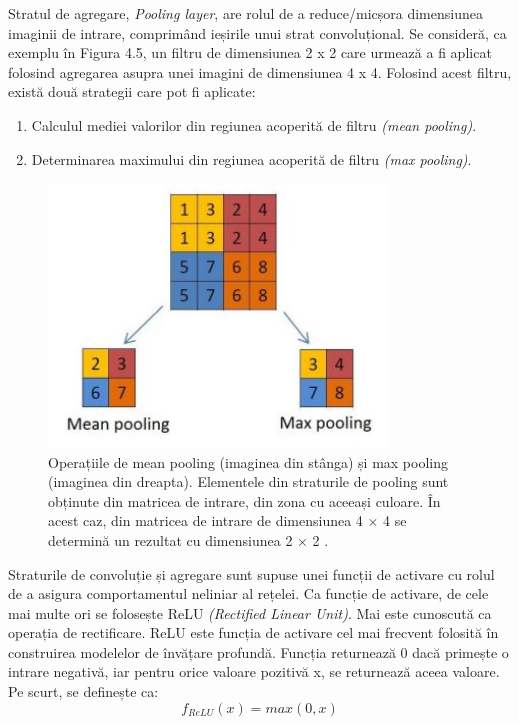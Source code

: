 \documentclass[a4paper,12pt]{report}
\begin{document}
Stratul de agregare, \emph{Pooling layer}, are rolul de a reduce/micșora dimensiunea 
imaginii de intrare, comprimând ieșirile unui strat convoluțional. Se consideră,
ca exemplu în Figura 4.5, un filtru de dimensiunea 2 x 2 care urmează a fi aplicat folosind agregarea asupra 
unei imagini de dimensiunea 4 x 4. Folosind acest filtru, există două strategii care pot fi 
aplicate:
\begin{enumerate}
    \item Calculul mediei valorilor din regiunea acoperită de filtru \emph{(mean pooling)}.
    \item Determinarea maximului din regiunea acoperită de filtru \emph{(max pooling)}.
\end{enumerate}

\begin{figure}[h!]
    \centering
    \includegraphics[width=9cm]{..//resources//images//pooling.JPG} 
    \caption{Operațiile de mean pooling (imaginea din stânga) și max pooling
    (imaginea din dreapta). 
    Elementele din straturile de pooling sunt obținute din matricea de intrare,
    din zona cu aceeași culoare. În acest caz, din matricea de intrare de dimensiunea 4 × 4
    se determină un rezultat cu dimensiunea 2 × 2 \cite{WEBSITE:rovislab}.}
\end{figure}

Straturile de convoluție și agregare sunt supuse unei funcții de activare cu rolul de a asigura
comportamentul neliniar al rețelei. Ca funcție de activare, de cele mai multe ori se folosește
ReLU \emph{(Rectified Linear Unit)}. Mai este cunoscută ca operația de rectificare.
ReLU este funcția de activare cel mai frecvent folosită în construirea 
modelelor de învățare profundă. Funcția returnează 0 dacă primește o intrare
negativă, iar pentru orice valoare pozitivă x, se returnează aceea valoare. 
Pe scurt, se definește ca:
\begin{equation*}
   f_{ReLU} (x) = max(0, x)
\end{equation*}
\end{document}
